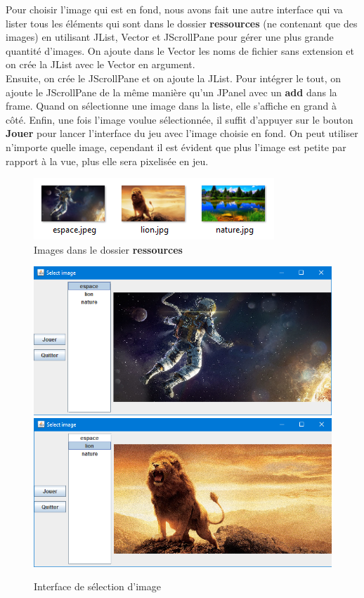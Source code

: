 \documentclass[a4paper,12pt]{article} %
\begin{document}
Pour choisir l'image qui est en fond, nous avons fait une autre interface qui va lister tous les éléments qui sont dans le dossier \textbf{ressources} (ne contenant que des images) en utilisant JList, Vector et JScrollPane pour gérer une plus grande quantité d'images. On ajoute dans le Vector les noms de fichier sans extension et on crée la JList avec le Vector en argument.\\
Ensuite, on crée le JScrollPane et on ajoute la JList. Pour intégrer le tout, on ajoute le JScrollPane de la même manière qu'un JPanel avec un \textbf{add} dans la frame. Quand on sélectionne une image dans la liste, elle s'affiche en grand à côté. Enfin, une fois l'image voulue sélectionnée, il suffit d'appuyer sur le bouton \textbf{Jouer} pour lancer l'interface du jeu avec l'image choisie en fond. On peut utiliser n'importe quelle image, cependant il est évident que plus l'image est petite par rapport à la vue, plus elle sera pixelisée en jeu.

\begin{figure}[!h]
\centering
\includegraphics[scale=0.8]{images/Capture5.PNG}
\caption{Images dans le dossier \textbf{ressources}}
\end{figure}

\begin{figure}[!h]
\centering
\includegraphics[scale=0.6]{images/Capture6.PNG}
\newpage
\vspace{0.1cm}
\includegraphics[scale=0.6]{images/Capture7.PNG}
\caption{Interface de sélection d'image}
\end{figure}
\end{document}
